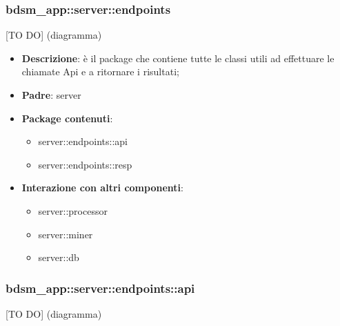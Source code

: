 


\subsubsection{bdsm\_app::server::endpoints} %
\label{ssub:bdsm_app_server_endpoints}
[TO DO] (diagramma) \newline \newline

\begin{itemize}
  \item \textbf{Descrizione}: è il package che contiene tutte le classi utili ad effettuare le chiamate Api e a ritornare i risultati;
  \item \textbf{Padre}: server
  \item \textbf{Package contenuti}:
  	\begin{itemize}
  		\item server::endpoints::api
  		\item server::endpoints::resp
	\end{itemize}
  \item \textbf{Interazione con altri componenti}:
  	\begin{itemize}
  		\item server::processor
  		\item server::miner
  		\item server::db
	\end{itemize}
\end{itemize}

\subsubsection{bdsm\_app::server::endpoints::api} %
\label{ssub:bdsm_app_server_endpoints_api}
[TO DO] (diagramma) \newline \newline

